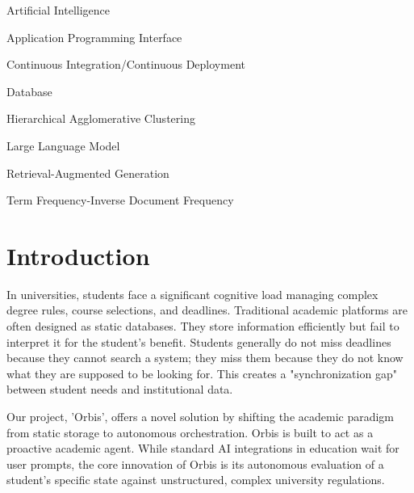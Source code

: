 \documentclass[a4paper,12pt]{article}
\begin{document}
\maketitle
{}
\makeabstract
{}
\maketableofcontents

\makelistoffigures
{}
\makelistoftables

\makelistofabbrv
\begin{abbrv}
    \item[AI] Artificial Intelligence
    \item[API] Application Programming Interface
    \item[CI/CD] Continuous Integration/Continuous Deployment
    \item[DB] Database
    \item[HAC] Hierarchical Agglomerative Clustering
    \item[LLM] Large Language Model
    \item[RAG] Retrieval-Augmented Generation
    \item[TF-IDF] Term Frequency-Inverse Document Frequency
\end{abbrv}
\newpage

\setcounter{page}{1}

\section{Introduction}
In universities, students face a significant cognitive load managing complex degree rules, course selections, and deadlines. Traditional academic platforms are often designed as static databases. They store information efficiently but fail to interpret it for the student's benefit. Students generally do not miss deadlines because they cannot search a system; they miss them because they do not know what they are supposed to be looking for. This creates a "synchronization gap" between student needs and institutional data.

Our project, 'Orbis', offers a novel solution by shifting the academic paradigm from static storage to autonomous orchestration. Orbis is built to act as a proactive academic agent. While standard AI integrations in education wait for user prompts, the core innovation of Orbis is its autonomous evaluation of a student's specific state against unstructured, complex university regulations. 
\end{document}
